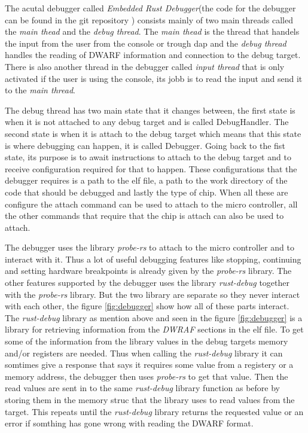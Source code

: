 The acutal debugger called \emph{Embedded Rust Debugger}(the code for the debugger can be found in the git repository \cite{erd}) consists mainly of two main threads called the \emph{main thead} and the \emph{debug thread}.
The \emph{main thead} is the thread that handels the input from the user from the console or trough \gls{dap} and the \emph{debug thread} handles the reading of \gls{DWARF} information and connection to the debug target.
There is also another thread in the debugger called \emph{input thread} that is only activated if the user is using the console, its jobb is to read the input and send it to the \emph{main thread}.


The debug thread has two main state that it changes between, the first state is when it is not attached to any debug target and is called DebugHandler.
The second state is when it is attach to the debug target which means that this state is where debugging can happen, it is called Debugger.
Going back to the fist state, its purpose is to await instructions to attach to the debug target and to receive configuration required for that to happen.
These configurations that the debugger requires is a path to the elf file, a path to the work directory of the code that should be debugged and lastly the type of chip.
When all these are configure the attach command can be used to attach to the micro controller, all the other commands that require that the chip is attach can also be used to attach.


The debugger uses the library \emph{probe-rs} \cite{probe} to attach to the micro controller and to interact with it.
Thus a lot of useful debugging features like stopping, continuing and setting hardware breakpoints is already given by the \emph{probe-rs} library.
The other features supported by the debugger uses the library \emph{rust-debug} together with the \emph{probe-rs} library.
But the two library are separate so they never interact with each other, the figure \ref{fig:debugger} show how all of these parts interact.
The \emph{rust-debug} library as mention above and seen in the figure \ref{fig:debugger} is a library for retrieving information from the \emph{DWRAF} sections in the \gls{elf} file.
To get some of the information from the library values in the debug targets memory and/or registers are needed.
Thus when calling the \emph{rust-debug} library it can somtimes give a response that says it requires some value from a registery or a memory address, the debugger then uses \emph{probe-rs} to get that value.
Then the read values are sent in to the same \emph{rust-debug} library function as before by storing them in the memory struc that the library uses to read values from the target.
This repeats until the \emph{rust-debug} library returns the requested value or an error if somthing has gone wrong with reading the \gls{DWARF} format.


